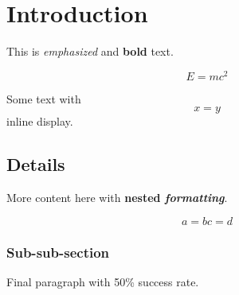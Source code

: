 \documentclass{article}
\begin{document}
\section{Introduction}

This is \emph{emphasized} and \textbf{bold} text.

\[
E = mc^2
\]

Some text with \[ x = y \] inline display.

\vspace{1cm}
\medskip
\smallskip
\bigskip

\subsection{Details}

More content here with \textbf{nested \emph{formatting}}.

\[
a = b
c = d
\]

\subsubsection{Sub-sub-section}

Final paragraph with 50\% success rate.
\end{document}
